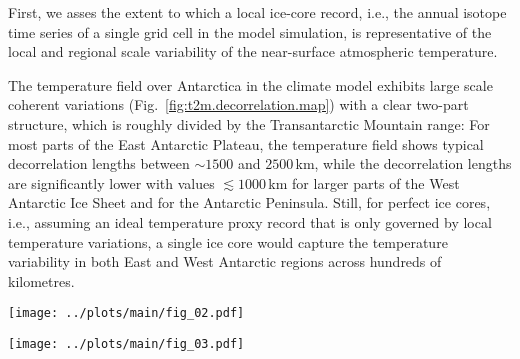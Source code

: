 \documentclass[cp, manuscript]{copernicus}
\begin{document}
First, we asses the extent to which a local ice-core record, i.e., the annual
isotope time series of a single grid cell in the model simulation, is
representative of the local and regional scale variability of the near-surface
atmospheric temperature.

The temperature field over Antarctica in the climate model exhibits large scale
coherent variations (Fig.~\ref{fig:t2m.decorrelation.map}) with a clear two-part
structure, which is roughly divided by the Transantarctic Mountain range: For
most parts of the East Antarctic Plateau, the temperature field shows typical
decorrelation lengths between $\sim1500$ and $2500$\,km, while the decorrelation
lengths are significantly lower with values $\lesssim1000$\,km for larger parts
of the West Antarctic Ice Sheet and for the Antarctic Peninsula.  Still, for
perfect ice cores, i.e., assuming an ideal temperature proxy record that is only
governed by local temperature variations, a single ice core would capture the
temperature variability in both East and West Antarctic regions across hundreds
of kilometres.

\begin{figure*}[t]%
\centering
\texttt{[image: ../plots/main/fig\_02.pdf]}
\caption{%
  Temperature decorrelation lengths across Antarctica. The temperature
  decorrelation lengths ($\tau$, in km) for each Antarctic model grid cell were
  estimated by fitting an exponential model to the correlation--distance
  relationship (cf. Eq.~\ref{eq:t2m.decorr}) obtained from correlating the local
  annual near-surface $T_{2\mathrm{m}}$ time series with the respective
  temperature time series from all other grid cells. Note that only the
  continental grid cells were used for the fit.}
\label{fig:t2m.decorrelation.map}%
\end{figure*}%

\begin{figure*}[t]%
\centering
\texttt{[image: ../plots/main/fig\_03.pdf]}
\caption{%
  The local temperature--isotope relationship across Antarctica. Shown are the
  local correlations for each model grid cell between the annual time series of
  (\textbf{a}) near-surface temperature ($T_{2\mathrm{m}}$) and
  precipitation-weighted oxygen isotope composition
  ($\delta^{18}\mathrm{O}^{\mathrm{(pw)}}$) and of (\textbf{b})
  precipitation-weighted near-surface temperature
  $T_{2\mathrm{m}}^{\mathrm{(pw)}}$ and
  $\delta^{18}\mathrm{O}^{\mathrm{(pw)}}$.}
\label{fig:t2m.oxy.correlation.maps}%
\end{figure*}%
\end{document}
